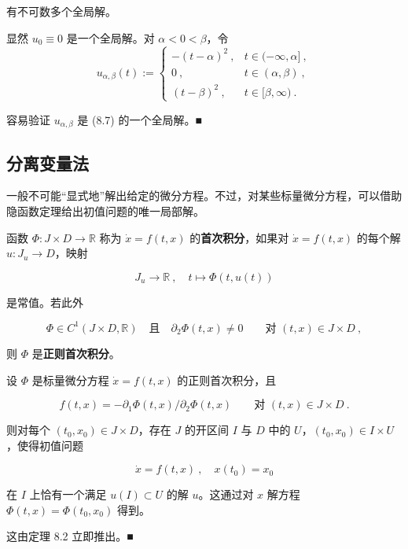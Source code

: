 \begin{remark}
\begin{items}
有不可数多个全局解。

\proofhead
显然 $ u_{0}\equiv 0 $ 是一个全局解。对 $ \alpha<0<\beta $，令
\begin{equation*}
u_{\alpha,\beta}(t):=\begin{cases}-(t-\alpha)^{2}\ , & t\in(-\infty,\alpha]\ ,\\ 0\ , & t\in(\alpha,\beta)\ ,\\ (t-\beta)^{2}\ , & t\in[\beta,\infty)\ .\end{cases}
\end{equation*}

容易验证 $ u_{\alpha,\beta} $ 是 (8.7) 的一个全局解。\nobreak\hspace{0.35em}■

\end{items}

\end{remark}

\subsection*{分离变量法}

一般不可能“显式地”解出给定的微分方程。不过，对某些标量微分方程，可以借助隐函数定理给出初值问题的唯一局部解。

函数 $ \Phi:J\times D\to\mathbb{R} $ 称为 $ \dot{x}=f(t,x) $ 的\textbf{首次积分}，如果对 $ \dot{x}=f(t,x) $ 的每个解 $ u:J_{u}\to D $，映射

\[
J_{u}\to\mathbb{R}\ ,\quad t\mapsto\Phi(t,u(t))
\]

是常值。若此外

\[
\Phi\in C^{1}(J\times D,\mathbb{R})\quad\text{且}\quad\partial_{2}\Phi(t,x)\ne 0\qquad\text{对 }(t,x)\in J\times D\ ,
\]

则 $ \Phi $ 是\textbf{正则首次积分}。

\begin{proposition}

设 $ \Phi $ 是标量微分方程 $ \dot{x}=f(t,x) $ 的正则首次积分，且

\[
f(t,x)=-\partial_{1}\Phi(t,x)/\partial_{2}\Phi(t,x)\qquad\text{对 }(t,x)\in J\times D \ .
\]

则对每个 $ (t_{0},x_{0})\in J\times D $，存在 $ J $ 的开区间 $ I $ 与 $ D $ 中的 $ U $，$ (t_{0},x_{0})\in I\times U $，使得初值问题

\[
\dot{x}=f(t,x)\ ,\quad x(t_{0})=x_{0}
\]

在 $ I $ 上恰有一个满足 $ u(I)\subset U $ 的解 $ u $。这通过对 $ x $ 解方程 $ \Phi(t,x)=\Phi(t_{0},x_{0}) $ 得到。

\proofhead
这由定理 8.2 立即推出。\nobreak\hspace{0.35em}■
\end{proposition}

